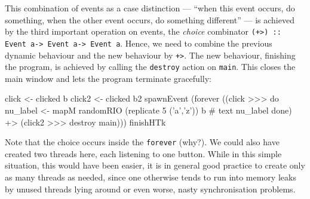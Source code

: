 This combination of events as a case distinction --- "`when this event
occurs, do something, when the other event occurs, do something
different"' --- is achieved by the third important operation on
events, the \emph{choice} combinator \texttt{(+>) :: Event a-> Event
  a-> Event a}. Hence, we need to combine the previous dynamic
behaviour and the new behaviour by \texttt{+>}. The new behaviour,
finishing the program, is achieved by calling the \texttt{destroy}
action on \texttt{main}.  This closes the main window and lets the
program terminate gracefully:
\begin{code}
     click  <- clicked b
     click2 <- clicked b2
     spawnEvent 
      (forever 
        ((click >>> do nu_label <- mapM randomRIO (replicate 5 ('a','z'))
                       b # text nu_label
                       done)
        +> (click2 >>> destroy main)))
     finishHTk
\end{code}
Note that the choice occurs inside the \texttt{forever} (why?). We
could also have created two threads here, each listening to one
button. While in this simple situation, this would have been easier,
it is in general good practice to create only as many threads as
needed, since one otherwise tends to run into memory leaks by unused
threads lying around or even worse, nasty synchronisation problems.



